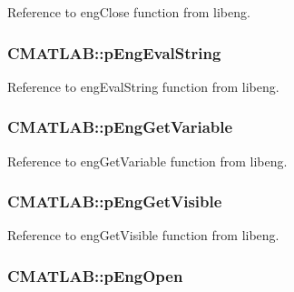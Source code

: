 Reference to eng\-Close function from libeng. 

\hypertarget{class_c_m_a_t_l_a_b_aa244761097ed2374d427ad452e693c4e}{
\subsubsection[{p\-Eng\-Eval\-String}]{ C\-M\-A\-T\-L\-A\-B\-::p\-Eng\-Eval\-String\hspace{0.3cm}{\ttfamily [private]}}}\label{class_c_m_a_t_l_a_b_aa244761097ed2374d427ad452e693c4e}


Reference to eng\-Eval\-String function from libeng. 

\hypertarget{class_c_m_a_t_l_a_b_a73c962dcd9c9ad01cf0db9fff3346adb}{
\subsubsection[{p\-Eng\-Get\-Variable}]{ C\-M\-A\-T\-L\-A\-B\-::p\-Eng\-Get\-Variable\hspace{0.3cm}{\ttfamily [private]}}}\label{class_c_m_a_t_l_a_b_a73c962dcd9c9ad01cf0db9fff3346adb}


Reference to eng\-Get\-Variable function from libeng. 

\hypertarget{class_c_m_a_t_l_a_b_a0e75bb62637fc4c4a4338ad0ca65e193}{
\subsubsection[{p\-Eng\-Get\-Visible}]{ C\-M\-A\-T\-L\-A\-B\-::p\-Eng\-Get\-Visible\hspace{0.3cm}{\ttfamily [private]}}}\label{class_c_m_a_t_l_a_b_a0e75bb62637fc4c4a4338ad0ca65e193}


Reference to eng\-Get\-Visible function from libeng. 

\hypertarget{class_c_m_a_t_l_a_b_a22bf0f3a6218ea5ccbff85e603c12455}{
\subsubsection[{p\-Eng\-Open}]{ C\-M\-A\-T\-L\-A\-B\-::p\-Eng\-Open\hspace{0.3cm}{\ttfamily [private]}}}\label{class_c_m_a_t_l_a_b_a22bf0f3a6218ea5ccbff85e603c12455}


